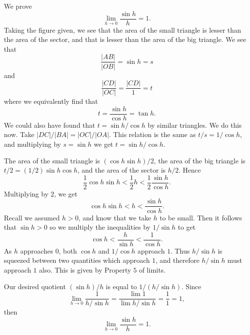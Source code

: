 We prove
\[\lim_{h\to0} \frac{\sin h}{h} = 1.\]
Taking the figure given, we see that the area of the small triangle is lesser than the area of the sector, and that is lesser than the area of the big triangle. We see that
\[\frac{|AB|}{|OB|} = \sin h = s\]
and
\[\frac{|CD|}{|OC|} = \frac{|CD|}{1} = t\]
where we equivalently find that
\[t = \frac{\sin h}{\cos h} = \tan h.\]
We could also have found that $t = \sin h/\cos h$ by similar triangles. We do this now. Take $|DC|/|BA| = |OC|/|OA|$.
This relation is the same as $t/s = 1/\cos h$, and multiplying by $s = \sin h$ we get $t = \sin h/\cos h$.

The area of the small triangle is $(\cos h \sin h)/2$, the area of the big triangle is $t/2 = (1/2)\sin h \cos h$, and the area of the sector is $h/2$. Hence
\[\frac{1}{2} \cos h \sin h < \frac{1}{2} h < \frac{1}{2} \frac{\sin h}{\cos h}.\]
Multiplying by $2$, we get
\[\cos h \sin h < h <\frac{\sin h}{\cos h}.\]
Recall we assumed $h > 0$, and know that we take $h$ to be small. Then it follows that $\sin h > 0$ so we multiply the inequalities by $1/\sin h$ to get
\[\cos h < \frac{h}{\sin h} < \frac{1}{\cos h}.\]
As $h$ approaches $0$, both $\cos h$ and $1/\cos h$ approach $1$. Thus $h/\sin h$ is squeezed between two quantities which approach $1$, and therefore $h/\sin h$ must approach $1$ also. This is given by Property $5$ of limits.

Our desired quotient $(\sin h)/h$ is equal to $1/(h/\sin h)$. Since
\[\lim_{h\to0} \frac{1}{h/\sin h} = \frac{\lim 1}{\lim h/\sin h} = \frac{1}{1} = 1,\]
then
\[\lim_{h\to0} \frac{\sin h}{h} = 1.\]
